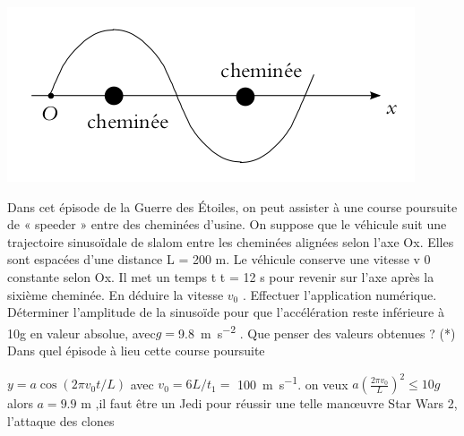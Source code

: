 \begin{Exercise}[title=Slalom entre des cheminées :Star Wars]
	\begin{center}
		\includegraphics[width=0.5\linewidth]{../fig/starwars.png}
	\end{center}
	Dans cet épisode de la Guerre des Étoiles, on peut assister à une course poursuite de « speeder » entre des cheminées d’usine. On suppose que le véhicule suit une trajectoire sinusoïdale de slalom entre les cheminées alignées selon l’axe Ox. Elles sont espacées d’une distance L = 200 m.
	\Question Le véhicule conserve une vitesse v 0 constante selon Ox. Il met un temps t t = 12 s pour revenir sur l’axe après la sixième cheminée. En déduire la vitesse $v_0$ . Effectuer l’application numérique.
	\Question Déterminer l’amplitude de la sinusoïde pour que l’accélération reste inférieure à 10g en 	valeur absolue, avec$ g = $\SI{9, 8}{\m\per\s^2} . Que penser des valeurs obtenues ?
	\Question (*) Dans quel épisode à lieu cette course poursuite
\end{Exercise}
\begin{Answer}
  \Question $y = a \cos(2\pi v_0 t /L)$ avec $v_0=6L/t_1 =$ \SI{100}{\m\per\s}.
	\Question on veux $a \left(\frac{2\pi v_0}{L}\right)^2 \leq 10g$ alors  $a =9.9$ m ,il faut être un Jedi pour réussir une telle manœuvre
	\Question Star Wars 2, l'attaque des clones
\end{Answer}
